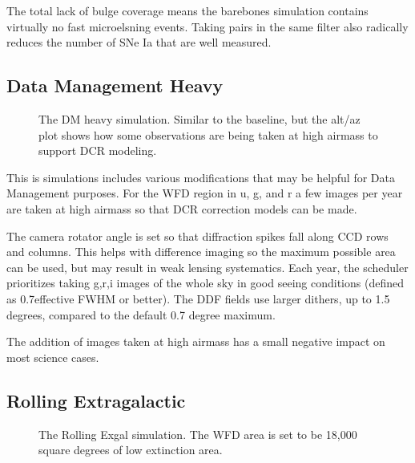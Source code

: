 The total lack of bulge coverage means the barebones simulation contains virtually no fast microelsning events. Taking pairs in the same filter also radically reduces the number of SNe Ia that are well measured. 

\subsection{Data Management Heavy}

\begin{figure}
\caption{The DM heavy simulation. Similar to the baseline, but the alt/az plot shows how some observations are being taken at high airmass to support DCR modeling.}\label{fig:dmheavy}
\end{figure}


This is simulations includes various modifications that may be helpful for Data Management purposes. For the WFD region in u, g, and r a few images per year are taken at high airmass so that DCR correction models can be made.

The camera rotator angle is set so that diffraction spikes fall along CCD rows and columns. This helps with difference imaging so the maximum possible area can be used, but may result in weak lensing systematics.  Each year, the scheduler prioritizes taking g,r,i images of the whole sky in good seeing conditions (defined as 0.7\arcsec effective FWHM or better).  The DDF fields use larger dithers, up to 1.5 degrees, compared to the default 0.7 degree maximum.

The addition of images taken at high airmass has a small negative impact on most science cases. 

\subsection{Rolling Extragalactic}

\begin{figure}
\caption{The Rolling Exgal simulation. The WFD area is set to be 18,000 square degrees of low extinction area.}\label{fig:rollingexgal}
\end{figure}


